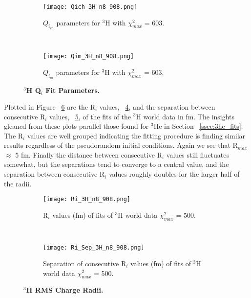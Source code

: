 \begin{figure}[!ht]
\begin{subfigure}{1.\textwidth}
  \centering
  \texttt{[image: Qich\_3H\_n8\_908.png]}
  \caption{$Q_{i_{ch}}$ parameters for $^3$H with $\chi^2_{max}$ = 603.}
  \label{fig:3h_qch}
\end{subfigure}\\
\begin{subfigure}{1.\textwidth}
  \centering
  \texttt{[image: Qim\_3H\_n8\_908.png]}
  \caption{$Q_{i_{m}}$ parameters for $^3$H with $\chi^2_{max}$ = 603.}
  \label{fig:3h_qm}
\end{subfigure}
\caption{\bf{$^3$H Q$_i$ Fit Parameters.}}
\label{fig:3h_qi}
\end{figure}

Plotted in Figure ~\ref{fig:3h_ri} are the R$_i$ values, ~\ref{fig:3h_ri_ind}, and the separation between consecutive R$_i$ values, ~\ref{fig:3h_ri_sep}, of the fits of the $^3$H world data in fm. The insights gleaned from these plots parallel those found for $^3$He in Section ~\ref{ssec:3he_fits}. The R$_i$ values are well grouped indicating the fitting procedure is finding similar results regardless of the pseudorandom initial conditions. Again we see that  R$_{max}$ $\approx$ 5 fm. Finally the distance between consecutive R$_i$ values still fluctuates somewhat, but the separations tend to converge to a central value, and the separation between consecutive R$_i$ values roughly doubles for the larger half of the radii.

\begin{figure}[!ht]
\begin{subfigure}{1.\textwidth}
  \centering
  \texttt{[image: Ri\_3H\_n8\_908.png]}
  \caption{R$_i$ values (fm) of fits of $^3$H world data $\chi^2_{max}$ = 500.}
  \label{fig:3h_ri_ind}
\end{subfigure}\\
\begin{subfigure}{1.\textwidth}
  \centering
  \texttt{[image: Ri\_Sep\_3H\_n8\_908.png]}
  \caption{Separation of consecutive R$_i$ values (fm) of fits of $^3$H world data $\chi^2_{max}$ = 500.}
  \label{fig:3h_ri_sep}
\end{subfigure}
\caption{\bf{$^3$H RMS Charge Radii.}}
\label{fig:3h_ri}
\end{figure}